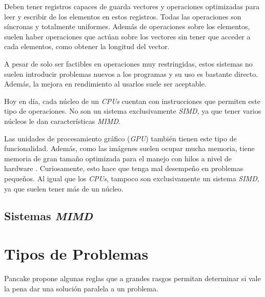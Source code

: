 Deben tener registros capaces de guarda vectores y operaciones optimizadas para
leer y escribir de los elementos en estos registros. Todas las operaciones son
síncronas y totalmente uniformes. Además de operaciones sobre los elementos,
suelen haber operaciones que actúan sobre los vectores sin tener que acceder a
cada elementos, como obtener la longitud del vector.

A pesar de solo ser factibles en operaciones muy restringidas, estos sistemas
no suelen introducir problemas nuevos a los programas y su uso es bastante
directo. Además, la mejora en rendimiento al usarlos suele ser aceptable.

Hoy en día, cada núcleo de un \textit{CPUs}  cuentan con
instrucciones que permiten este tipo de operaciones. No son un sistema
exclusivamente \textit{SIMD}, ya que tener varios núcleos le dan 
características \textit{MIMD}.

Las unidades de procesamiento gráfico (\textit{GPU})  también tienen
este tipo de funcionalidad. Además, como las imágenes suelen ocupar mucha
memoria, tiene memoria de gran tamaño optimizada para el manejo con hilos a
nivel de hardware . Curiosamente, esto hace que tenga mal
desempeño en problemas pequeños. Al igual que los \textit{CPUs}, tampoco son
exclusivamente un sistema \textit{SIMD}, ya que suelen tener más de un núcleo.

\subsection{Sistemas \textit{MIMD}}

\section{Tipos de Problemas}

Pancake \cite{Pancake1996} propone algunas reglas que a grandes rasgos permitan
determinar si vale la pena dar una solución paralela a un problema.

